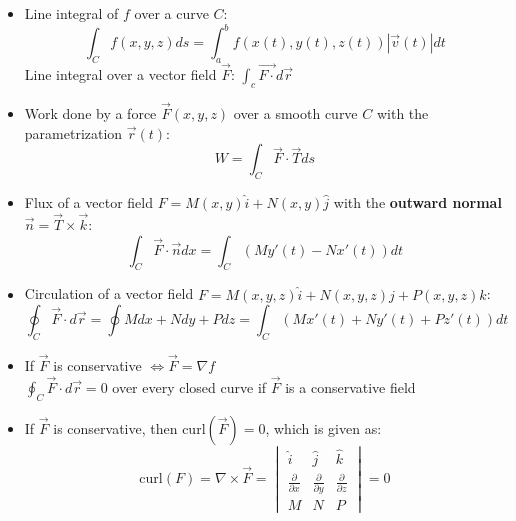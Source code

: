 \documentclass[a4paper]{article}
\begin{document}
\begin{itemize}
    \item Line integral of $f$ over a curve $C$:
    \begin{equation*}
        \int_{C} f(x,y,z)ds = \int_{a}^{b}f(x(t),y(t),z(t))|\vec{v}(t)|dt
    \end{equation*}
    Line integral over a vector field $\overrightarrow{F}$: $\int_{c}\overrightarrow{F\cdot} d\vec{r}$
    \item Work done by a force $\overrightarrow{F}(x,y,z)$ over a smooth curve $C$ with the parametrization $\vec{r}(t)$:
    \begin{equation*}
        W = \int_{C}\overrightarrow{F}\cdot\overrightarrow{T}ds
    \end{equation*}
    \item Flux of a vector field $F = M(x,y)\hat{i}+N(x,y)\hat{j}$ with the \textbf{outward normal} $\vec{n} = \overrightarrow{T}\times\vec{k}$:
    \begin{equation*}
        \int_{C}\overrightarrow{F}\cdot\vec{n}dx = \int_{C}(My'(t)-Nx'(t))dt
    \end{equation*}
    
    \item Circulation of a vector field $F = M(x,y,z)\hat{i}+N(x,y,z)\hat{j}+P(x,y,z)\hat{k}$:
    \begin{equation*}
        \oint_{C}\overrightarrow{F}\cdot d\vec{r} = \oint Mdx+Ndy+Pdz = \int_{C}(Mx'(t)+Ny'(t)+Pz'(t))dt
    \end{equation*}
    \item If $\overrightarrow{F}$ is conservative $\Leftrightarrow \overrightarrow{F} = \nabla f$\\
    $\oint_{C}\overrightarrow{F}\cdot d\vec{r} = 0$ over every closed curve if $\overrightarrow{F}$ is a conservative field
    \item If $\overrightarrow{F}$ is conservative, then $\text{curl}(\overrightarrow{F}) = 0$, which is given as:
    \begin{equation*}
        \text{curl}(F) = \nabla\times\overrightarrow{F} = 
        \begin{vmatrix}
            \hat{i} & \hat{j} & \hat{k}\\
            \frac{\partial}{\partial x} & \frac{\partial}{\partial y} & \frac{\partial}{\partial z}\\
            M & N & P
        \end{vmatrix} = 0
    \end{equation*}
    

\end{itemize}
\end{document}
